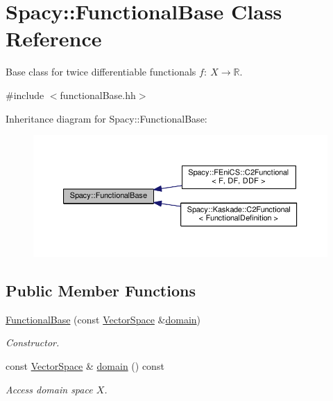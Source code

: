 \hypertarget{classSpacy_1_1FunctionalBase}{}\section{Spacy\+:\+:Functional\+Base Class Reference}
\label{classSpacy_1_1FunctionalBase}


Base class for twice differentiable functionals $ f:\ X\rightarrow \mathbb{R}$.  




{\ttfamily \#include $<$functional\+Base.\+hh$>$}



Inheritance diagram for Spacy\+:\+:Functional\+Base\+:\nopagebreak
\begin{figure}[H]
\begin{center}
\leavevmode
\includegraphics[width=350pt]{classSpacy_1_1FunctionalBase__inherit__graph}
\end{center}
\end{figure}
\subsection*{Public Member Functions}
\begin{DoxyCompactItemize}
\item 
\hyperlink{classSpacy_1_1FunctionalBase_aa655b0f2b96f02a3137dad89e3f0d2ac}{Functional\+Base} (const \hyperlink{classSpacy_1_1VectorSpace}{Vector\+Space} \&\hyperlink{classSpacy_1_1FunctionalBase_a2d3397deb9fa1ad85ed04e37a03b3aa6}{domain})
\begin{DoxyCompactList}\small\item\em Constructor. \end{DoxyCompactList}\item 
\hypertarget{classSpacy_1_1FunctionalBase_a2d3397deb9fa1ad85ed04e37a03b3aa6}{}const \hyperlink{classSpacy_1_1VectorSpace}{Vector\+Space} \& \hyperlink{classSpacy_1_1FunctionalBase_a2d3397deb9fa1ad85ed04e37a03b3aa6}{domain} () const \label{classSpacy_1_1FunctionalBase_a2d3397deb9fa1ad85ed04e37a03b3aa6}

\begin{DoxyCompactList}\small\item\em Access domain space $X$. \end{DoxyCompactList}\end{DoxyCompactItemize}


